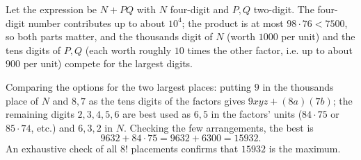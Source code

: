 Let the expression be $N+PQ$ with $N$ four-digit and $P,Q$ two-digit. The four-digit number contributes up to about $10^4$; the product is at most $98\cdot76<7500$, so both parts matter, and the thousands digit of $N$ (worth $1000$ per unit) and the tens digits of $P,Q$ (each worth roughly $10$ times the other factor, i.e. up to about $900$ per unit) compete for the largest digits.

Comparing the options for the two largest places: putting $9$ in the thousands place of $N$ and $8,7$ as the tens digits of the factors gives $9xyz+(8a)(7b)$; the remaining digits $2,3,4,5,6$ are best used as $6,5$ in the factors' units ($84\cdot75$ or $85\cdot74$, etc.) and $6,3,2$ in $N$. Checking the few arrangements, the best is
\[
9632+84\cdot75=9632+6300=\boxed{15932}.
\]
An exhaustive check of all $8!$ placements confirms that $15932$ is the maximum.
